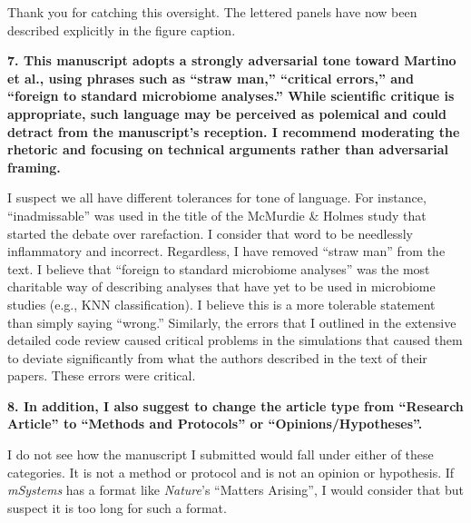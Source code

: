 \documentclass[
  11pt,
]{article}
\begin{document}
Thank you for catching this oversight. The lettered panels have now been
described explicitly in the figure caption.

\textbf{7. This manuscript adopts a strongly adversarial tone toward
Martino et al., using phrases such as ``straw man,'' ``critical
errors,'' and ``foreign to standard microbiome analyses.'' While
scientific critique is appropriate, such language may be perceived as
polemical and could detract from the manuscript's reception. I recommend
moderating the rhetoric and focusing on technical arguments rather than
adversarial framing.}

I suspect we all have different tolerances for tone of language. For
instance, ``inadmissable'' was used in the title of the McMurdie \&
Holmes study that started the debate over rarefaction. I consider that
word to be needlessly inflammatory and incorrect. Regardless, I have
removed ``straw man'' from the text. I believe that ``foreign to
standard microbiome analyses'' was the most charitable way of describing
analyses that have yet to be used in microbiome studies (e.g., KNN
classification). I believe this is a more tolerable statement than
simply saying ``wrong.'' Similarly, the errors that I outlined in the
extensive detailed code review caused critical problems in the
simulations that caused them to deviate significantly from what the
authors described in the text of their papers. These errors were
critical.

\textbf{8. In addition, I also suggest to change the article type from
``Research Article'' to ``Methods and Protocols'' or
``Opinions/Hypotheses''.}

I do not see how the manuscript I submitted would fall under either of
these categories. It is not a method or protocol and is not an opinion
or hypothesis. If \emph{mSystems} has a format like \emph{Nature}'s
``Matters Arising'', I would consider that but suspect it is too long
for such a format.
\end{document}
